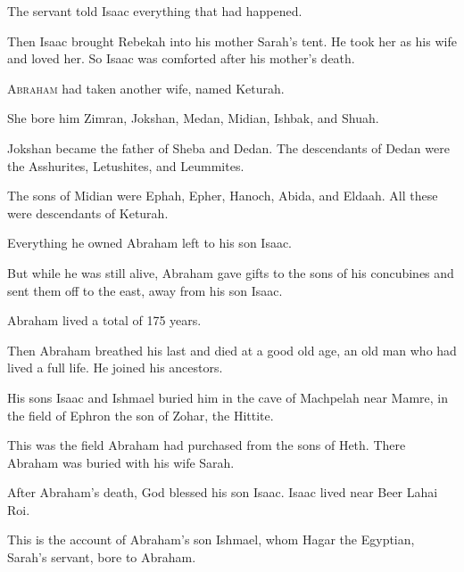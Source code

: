 \begin{scripture}
 The servant told Isaac everything that had happened.
 Then Isaac brought Rebekah into his mother Sarah's tent. He took her as his wife and loved her. So Isaac was comforted after his mother's death.

 \allowchapbreak\hypertarget{ch-genesis-25}{}\lettrine[lines=5]{\color{pentateuch}A}{\textsc{braham}} had taken another wife, named Keturah.\everypar{}
 She bore him Zimran, Jokshan, Medan, Midian, Ishbak, and Shuah.
 Jokshan became the father of Sheba and Dedan. The descendants of Dedan were the Asshurites, Letushites, and Leummites.
 The sons of Midian were Ephah, Epher, Hanoch, Abida, and Eldaah. All these were descendants of Keturah.
\\\indent{} Everything he owned Abraham left to his son Isaac.
 But while he was still alive, Abraham gave gifts to the sons of his concubines and sent them off to the east, away from his son Isaac.
\everypar{}

 Abraham lived a total of 175 years.
 Then Abraham breathed his last and died at a good old age, an old man who had lived a full life. He joined his ancestors.
 His sons Isaac and Ishmael buried him in the cave of Machpelah near Mamre, in the field of Ephron the son of Zohar, the Hittite.
 This was the field Abraham had purchased from the sons of Heth. There Abraham was buried with his wife Sarah.
 After Abraham's death, God blessed his son Isaac. Isaac lived near Beer Lahai Roi.
\everypar{}

 This is the account of Abraham's son Ishmael, whom Hagar the Egyptian, Sarah's servant, bore to Abraham.
\everypar{}


\end{scripture}
